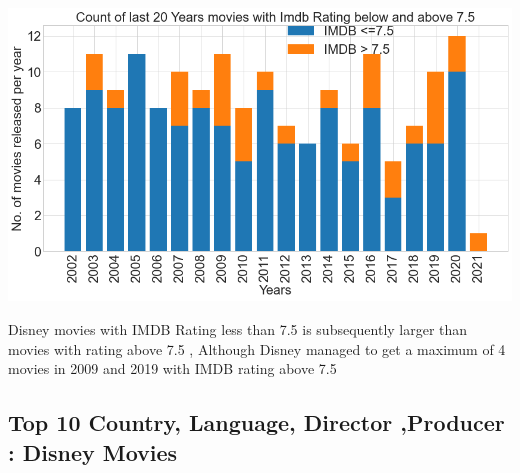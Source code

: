 \documentclass{article}
\begin{document}
\noindent\begin{minipage}{0.4\textwidth}
\includegraphics[width=\linewidth]{figures/17.png}
\textcolor{Orange}{\textbf{}}
\end{minipage}%
\hfill%
\begin{minipage}{0.55\textwidth}
Disney movies with IMDB Rating less than 7.5 is subsequently larger than  movies with rating above 7.5 , Although Disney managed to get a maximum of 4 movies in 2009 and 2019  with IMDB rating above 7.5
\end{minipage}
\subsection{Top 10 Country, Language, Director ,Producer : Disney Movies}
\end{document}
